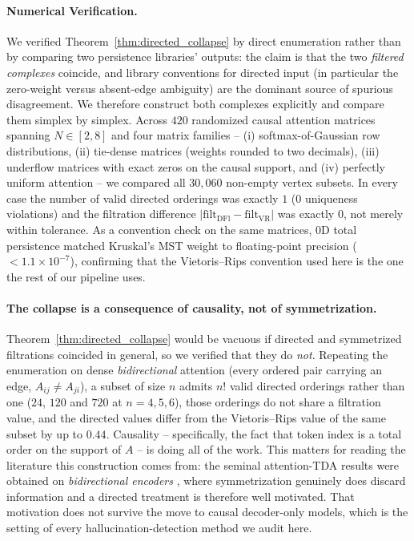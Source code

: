 \documentclass{article}
\begin{document}
\paragraph{Numerical Verification.} We verified Theorem~\ref{thm:directed_collapse} by direct enumeration rather than by comparing two persistence libraries' outputs: the claim is that the two \emph{filtered complexes} coincide, and library conventions for directed input (in particular the zero-weight versus absent-edge ambiguity) are the dominant source of spurious disagreement. We therefore construct both complexes explicitly and compare them simplex by simplex. Across $420$ randomized causal attention matrices spanning $N \in [2,8]$ and four matrix families -- (i) softmax-of-Gaussian row distributions, (ii) tie-dense matrices (weights rounded to two decimals), (iii) underflow matrices with exact zeros on the causal support, and (iv) perfectly uniform attention -- we compared all $30{,}060$ non-empty vertex subsets. In every case the number of valid directed orderings was exactly $1$ ($0$ uniqueness violations) and the filtration difference $|\mathrm{filt}_{\mathrm{DFl}} - \mathrm{filt}_{\mathrm{VR}}|$ was exactly $0$, not merely within tolerance. As a convention check on the same matrices, $0$D total persistence matched Kruskal's MST weight to floating-point precision ($< 1.1 \times 10^{-7}$), confirming that the Vietoris--Rips convention used here is the one the rest of our pipeline uses.

\paragraph{The collapse is a consequence of causality, not of symmetrization.} Theorem~\ref{thm:directed_collapse} would be vacuous if directed and symmetrized filtrations coincided in general, so we verified that they do \emph{not}. Repeating the enumeration on dense \emph{bidirectional} attention (every ordered pair carrying an edge, $A_{ij} \ne A_{ji}$), a subset of size $n$ admits $n!$ valid directed orderings rather than one ($24$, $120$ and $720$ at $n=4,5,6$), those orderings do not share a filtration value, and the directed values differ from the Vietoris--Rips value of the same subset by up to $0.44$. Causality -- specifically, the fact that token index is a total order on the support of $A$ -- is doing all of the work. This matters for reading the literature this construction comes from: the seminal attention-TDA results were obtained on \emph{bidirectional encoders} \citep{kushnareva2021, cherniavskii2022}, where symmetrization genuinely does discard information and a directed treatment is therefore well motivated. That motivation does not survive the move to causal decoder-only models, which is the setting of every hallucination-detection method we audit here.
\end{document}
